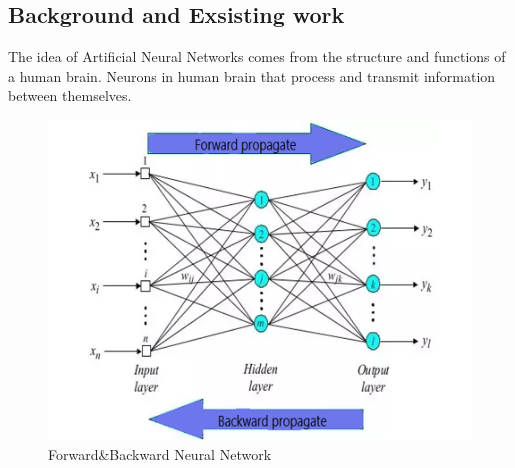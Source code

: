 \documentclass{article}
\begin{document}
\subsection{Background and Exsisting work}
The idea of Artificial Neural Networks comes from the structure and functions of a human brain. Neurons in human brain that process and transmit information between themselves.
\begin{figure}[H]
\includegraphics[scale=0.65]{./NN_general.png}
\centering
\caption{Forward\&Backward Neural Network}
\end{figure}
\end{document}
